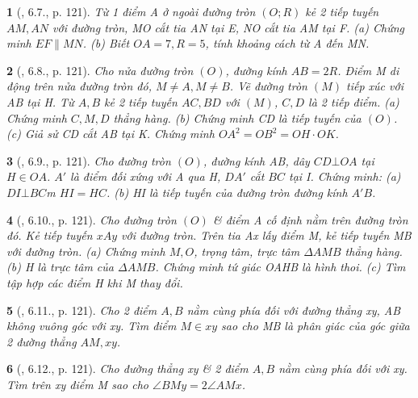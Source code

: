 \documentclass{article}
\newtheorem{baitoan}{}
\begin{document}
\begin{baitoan}[\cite{Binh_boi_duong_Toan_9_tap_1}, 6.7., p. 121]
	Từ 1 điểm A ở ngoài đường tròn $(O;R)$ kẻ 2 tiếp tuyến $AM,AN$ với đường tròn, MO cắt tia AN tại E, NO cắt tia AM tại F. (a) Chứng minh $EF\parallel MN$. (b) Biết $OA = 7,R = 5$, tính khoảng cách từ A đến MN.
\end{baitoan}

\begin{baitoan}[\cite{Binh_boi_duong_Toan_9_tap_1}, 6.8., p. 121]
	Cho nửa đường tròn $(O)$, đường kính $AB = 2R$. Điểm M di động trên nửa đường tròn đó, $M\ne A,M\ne B$. Vẽ đường tròn $(M)$ tiếp xúc với AB tại H. Từ $A,B$ kẻ 2 tiếp tuyến $AC,BD$ với $(M)$, $C,D$ là 2 tiếp điểm. (a) Chứng minh $C,M,D$ thẳng hàng. (b) Chứng minh CD là tiếp tuyến của $(O)$. (c) Giả sử CD cắt AB tại K. Chứng minh $OA^2 = OB^2 = OH\cdot OK$.
\end{baitoan}

\begin{baitoan}[\cite{Binh_boi_duong_Toan_9_tap_1}, 6.9., p. 121]
	Cho đường tròn $(O)$, đường kính AB, dây $CD\bot OA$ tại $H\in OA$. $A'$ là điểm đối xứng với A qua H, $DA'$ cắt $BC$ tại I. Chứng minh: (a) $DI\bot BC$m $HI = HC$. (b) HI là tiếp tuyến của đường tròn đường kính $A'B$.
\end{baitoan}

\begin{baitoan}[\cite{Binh_boi_duong_Toan_9_tap_1}, 6.10., p. 121]
	Cho đường tròn $(O)$ \& điểm A cố định nằm trên đường tròn đó. Kẻ tiếp tuyến $xAy$ với đường tròn. Trên tia Ax lấy điểm M, kẻ tiếp tuyến MB với đường tròn. (a) Chứng minh $M,O$, trọng tâm, trực tâm $\Delta AMB$ thẳng hàng. (b) H là trực tâm của $\Delta AMB$. Chứng minh tứ giác OAHB là hình thoi. (c) Tìm tập hợp các điểm H khi M thay đổi.
\end{baitoan}

\begin{baitoan}[\cite{Binh_boi_duong_Toan_9_tap_1}, 6.11., p. 121]
	Cho 2 điểm $A,B$ nằm cùng phía đối với đường thẳng xy, AB không vuông góc với xy. Tìm điểm $M\in xy$ sao cho MB là phân giác của góc giữa 2 đường thẳng $AM,xy$.
\end{baitoan}

\begin{baitoan}[\cite{Binh_boi_duong_Toan_9_tap_1}, 6.12., p. 121]
	Cho đường thẳng xy \& 2 điểm $A,B$ nằm cùng phía đối với xy. Tìm trên xy điểm M sao cho $\angle{BMy} = 2\angle{AMx}$.
\end{baitoan}
\end{document}
